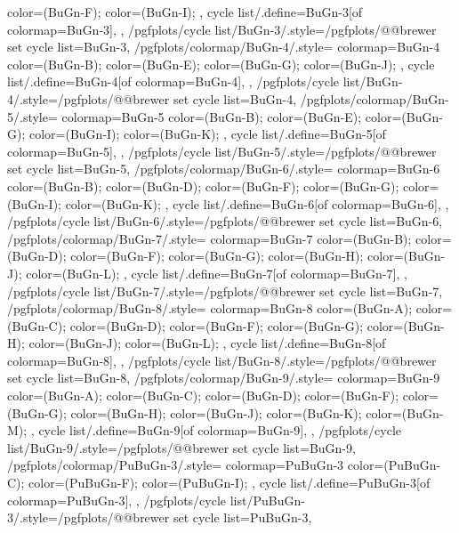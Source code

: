 {{{      color=(BuGn-F);
      color=(BuGn-I);
    },
    cycle list/.define={BuGn-3}{[of colormap=BuGn-3]},
  },
  /pgfplots/cycle list/BuGn-3/.style={/pgfplots/@@brewer set cycle list={BuGn-3}},
  /pgfplots/colormap/BuGn-4/.style={
    colormap={BuGn-4}{
      color=(BuGn-B);
      color=(BuGn-E);
      color=(BuGn-G);
      color=(BuGn-J);
    },
    cycle list/.define={BuGn-4}{[of colormap=BuGn-4]},
  },
  /pgfplots/cycle list/BuGn-4/.style={/pgfplots/@@brewer set cycle list={BuGn-4}},
  /pgfplots/colormap/BuGn-5/.style={
    colormap={BuGn-5}{
      color=(BuGn-B);
      color=(BuGn-E);
      color=(BuGn-G);
      color=(BuGn-I);
      color=(BuGn-K);
    },
    cycle list/.define={BuGn-5}{[of colormap=BuGn-5]},
  },
  /pgfplots/cycle list/BuGn-5/.style={/pgfplots/@@brewer set cycle list={BuGn-5}},
  /pgfplots/colormap/BuGn-6/.style={
    colormap={BuGn-6}{
      color=(BuGn-B);
      color=(BuGn-D);
      color=(BuGn-F);
      color=(BuGn-G);
      color=(BuGn-I);
      color=(BuGn-K);
    },
    cycle list/.define={BuGn-6}{[of colormap=BuGn-6]},
  },
  /pgfplots/cycle list/BuGn-6/.style={/pgfplots/@@brewer set cycle list={BuGn-6}},
  /pgfplots/colormap/BuGn-7/.style={
    colormap={BuGn-7}{
      color=(BuGn-B);
      color=(BuGn-D);
      color=(BuGn-F);
      color=(BuGn-G);
      color=(BuGn-H);
      color=(BuGn-J);
      color=(BuGn-L);
    },
    cycle list/.define={BuGn-7}{[of colormap=BuGn-7]},
  },
  /pgfplots/cycle list/BuGn-7/.style={/pgfplots/@@brewer set cycle list={BuGn-7}},
  /pgfplots/colormap/BuGn-8/.style={
    colormap={BuGn-8}{
      color=(BuGn-A);
      color=(BuGn-C);
      color=(BuGn-D);
      color=(BuGn-F);
      color=(BuGn-G);
      color=(BuGn-H);
      color=(BuGn-J);
      color=(BuGn-L);
    },
    cycle list/.define={BuGn-8}{[of colormap=BuGn-8]},
  },
  /pgfplots/cycle list/BuGn-8/.style={/pgfplots/@@brewer set cycle list={BuGn-8}},
  /pgfplots/colormap/BuGn-9/.style={
    colormap={BuGn-9}{
      color=(BuGn-A);
      color=(BuGn-C);
      color=(BuGn-D);
      color=(BuGn-F);
      color=(BuGn-G);
      color=(BuGn-H);
      color=(BuGn-J);
      color=(BuGn-K);
      color=(BuGn-M);
    },
    cycle list/.define={BuGn-9}{[of colormap=BuGn-9]},
  },
  /pgfplots/cycle list/BuGn-9/.style={/pgfplots/@@brewer set cycle list={BuGn-9}},
  /pgfplots/colormap/PuBuGn-3/.style={
    colormap={PuBuGn-3}{
      color=(PuBuGn-C);
      color=(PuBuGn-F);
      color=(PuBuGn-I);
    },
    cycle list/.define={PuBuGn-3}{[of colormap=PuBuGn-3]},
  },
  /pgfplots/cycle list/PuBuGn-3/.style={/pgfplots/@@brewer set cycle list={PuBuGn-3}},
}
